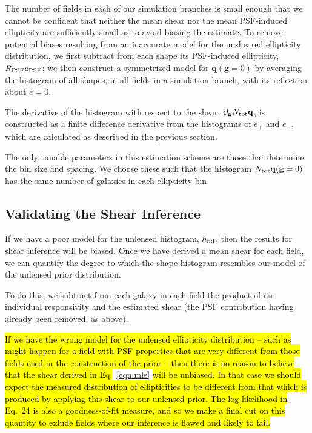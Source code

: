 \documentclass[iop]{emulateapj}
\newcommand\rmcomment[1]{\textcolor{red}{(RM: #1)}}
\begin{document}
The number of fields in each of our simulation branches is small
enough that we cannot be confident that neither the mean shear nor the
mean PSF-induced ellipticity are sufficiently small as to avoid
biasing the estimate. To remove potential biases resulting from an
inaccurate model for the unsheared ellipticity distribution, we first
subtract from each shape its PSF-induced ellipticity,
$R_{\rm PSF}e_{\rm PSF}$; we then construct a symmetrized model for
$\mathbf{q}(\mathbf{g} = 0)$ by averaging the histogram of all shapes, in all
fields in a simulation branch, with its reflection about $e=0$.

The derivative of the histogram with respect to the shear,
$\partial_{\mathbf{g}} N_{\rm tot} \mathbf{q}$, is constructed as a finite difference
derivative from the histograms of $e_+$ and $e_-$, which are
calculated as described in the previous section.

The only tunable parameters in this estimation scheme are those that
determine the bin size and spacing. We choose these such that the
histogram $N_{\rm tot} \mathbf{q} (\mathbf{g}=0)$ has the same number
of galaxies in each ellipticity bin.


\subsection{Validating the Shear Inference}
\label{sec:model_checking}


If we have a poor model for the unlensed histogram, $h_{\rm fid}$,
then the results for shear inference will be biased. Once we have
derived a mean shear for each field, we can quantify the degree to
which the shape histogram resembles our model of the unlensed prior
distribution.

To do this, we subtract from each galaxy in each field the product of
its individual responsivity and the estimated shear (the PSF
contribution having already been removed, as above).


\hl{If we have the wrong model for the unlensed ellipticity distribution
-- such as might happen for a field with PSF properties that are very
different from those fields used in the construction of the prior --
then there is no reason to believe that the shear derived in
Eq.}~\ref{eqn:mle} \hl{will be unbiased. In that case we should expect the
measured distribution of ellipticities to be different from that which
is produced by applying this shear to our unlensed prior. The
log-likelihood in Eq.~24 is also a goodness-of-fit measure, and so we
make a final cut on this quantity to exlude fields where our inference
is flawed and likely to fail.}
\end{document}

